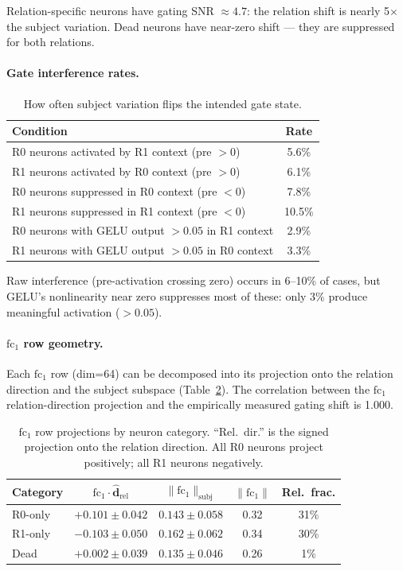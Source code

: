 \documentclass[11pt,a4paper]{article}
\newcommand{\fc}{\mathrm{fc}}
\begin{document}
Relation-specific neurons have gating SNR $\approx 4.7$: the relation
shift is nearly 5$\times$ the subject variation. Dead neurons have
near-zero shift --- they are suppressed for both relations.

\paragraph{Gate interference rates.}

\begin{table}[h]
\centering
\caption{How often subject variation flips the intended gate state.}
\label{tab:interference}
\begin{tabular}{lc}
\toprule
Condition & Rate \\
\midrule
R0 neurons activated by R1 context (pre $> 0$) & 5.6\% \\
R1 neurons activated by R0 context (pre $> 0$) & 6.1\% \\
R0 neurons suppressed in R0 context (pre $< 0$) & 7.8\% \\
R1 neurons suppressed in R1 context (pre $< 0$) & 10.5\% \\
\midrule
R0 neurons with GELU output $> 0.05$ in R1 context & 2.9\% \\
R1 neurons with GELU output $> 0.05$ in R0 context & 3.3\% \\
\bottomrule
\end{tabular}
\end{table}

\noindent Raw interference (pre-activation crossing zero) occurs in
6--10\% of cases, but GELU's nonlinearity near zero suppresses most of
these: only 3\% produce meaningful activation ($> 0.05$).

\paragraph{$\fc_1$ row geometry.}
Each $\fc_1$ row (dim=64) can be decomposed into its projection onto
the relation direction and the subject subspace
(Table~\ref{tab:fc1_geometry}). The correlation between the $\fc_1$
relation-direction projection and the empirically measured gating shift
is 1.000.

\begin{table}[h]
\centering
\caption{$\fc_1$ row projections by neuron category. ``Rel.\ dir.''
  is the signed projection onto the relation direction. All R0 neurons
  project positively; all R1 neurons negatively.}
\label{tab:fc1_geometry}
\begin{tabular}{lcccc}
\toprule
Category & $\fc_1 \cdot \hat{\mathbf{d}}_{\text{rel}}$ & $\|\fc_1\|_{\text{subj}}$ & $\|\fc_1\|$ & Rel.\ frac. \\
\midrule
R0-only & $+0.101 \pm 0.042$ & $0.143 \pm 0.058$ & 0.32 & 31\% \\
R1-only & $-0.103 \pm 0.050$ & $0.162 \pm 0.062$ & 0.34 & 30\% \\
Dead & $+0.002 \pm 0.039$ & $0.135 \pm 0.046$ & 0.26 & 1\% \\
\bottomrule
\end{tabular}
\end{table}
\end{document}
